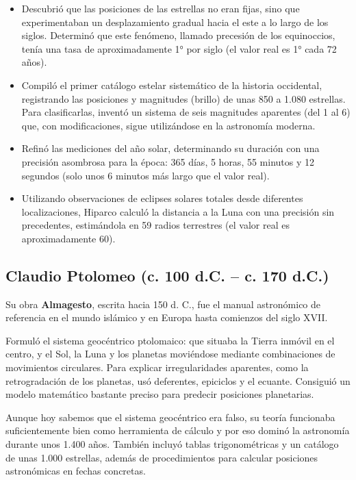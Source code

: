 \documentclass[a4paper,12pt]{article} %
\begin{document}
\begin{justify}
	\begin{itemize}
		\item Descubrió que las posiciones de las estrellas no eran fijas, sino que experimentaban un desplazamiento gradual hacia el este a lo largo de los siglos. 
		Determinó que este fenómeno, llamado precesión de los equinoccios, tenía una tasa de aproximadamente 1° por siglo (el valor real es 1° cada 72 años). 
		
		\item Compiló el primer catálogo estelar sistemático de la historia occidental, registrando las posiciones y magnitudes (brillo) de unas 850 a 1.080 estrellas. 
		Para clasificarlas, inventó un sistema de seis magnitudes aparentes (del 1 al 6) que, con modificaciones, sigue utilizándose en la astronomía moderna.

		\item Refinó las mediciones del año solar, determinando su duración con una precisión asombrosa para la época: 365 días, 5 horas, 55 minutos y 12 segundos (solo unos 6 minutos más largo que el valor real).
		
		\item Utilizando observaciones de eclipses solares totales desde diferentes localizaciones, Hiparco calculó la distancia a la Luna con una precisión sin precedentes, estimándola en 59 radios terrestres (el valor real es aproximadamente 60).
	\end{itemize}
\end{justify}


\newpage 

\subsection{ Claudio Ptolomeo (c. 100 d.C. -- c. 170 d.C.)}
\begin{justify}
	Su obra \textbf{Almagesto}, escrita hacia 150
	d. C., fue el manual astronómico de referencia en el mundo islámico y en Europa hasta comienzos
	del siglo XVII.
\end{justify}
\begin{justify}
	Formuló el sistema geocéntrico ptolomaico: que situaba la Tierra inmóvil en el centro, y el Sol, la
	Luna y los planetas moviéndose mediante combinaciones de movimientos circulares.
	Para explicar irregularidades aparentes, como la retrogradación de los planetas, usó deferentes,
	epiciclos y el ecuante. Consiguió un modelo matemático bastante preciso para predecir posiciones
	planetarias.
\end{justify}
\begin{justify}
	Aunque hoy sabemos que el sistema geocéntrico era falso, su teoría funcionaba suficientemente bien
	como herramienta de cálculo y por eso dominó la astronomía durante unos 1.400 años.
	También incluyó tablas trigonométricas y un catálogo de unas 1.000 estrellas, además de
	procedimientos para calcular posiciones astronómicas en fechas concretas.
\end{justify}
\end{document}
